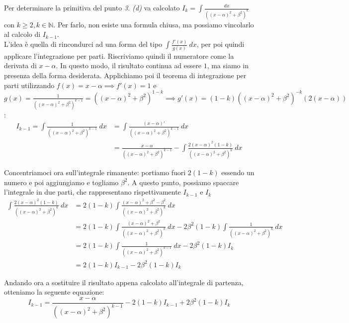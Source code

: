 \documentclass{article}
\begin{document}
\noindent Per determinare la primitiva del punto \textit{3. (d)} va calcolato $I_k = \int \frac{dx}{((x - \alpha)^2 + \beta^2)^k}$ con $k \geq 2, k \in \mathbb{N}$. Per farlo, non esiste una formula chiusa, ma possiamo vincolarlo al calcolo di $I_{k - 1}$. \\
L'idea è quella di rincondurci ad una forma del tipo $\int \frac{f'(x)}{g(x)} \ dx$, per poi quindi applicare l'integrazione per parti. Riscriviamo quindi il numeratore come la derivata di $x - \alpha$. In questo modo, il risultato continua ad essere $1$, ma siamo in presenza della forma desiderata. Applichiamo poi il teorema di integrazione per parti utilizzando $f(x) = x - \alpha \implies f'(x) = 1$ e $g(x) = \frac{1}{((x - \alpha)^2 + \beta^2)^{k - 1}} = ((x - \alpha)^2 + \beta^2)^{1 - k} \implies g'(x) = (1 - k)((x - \alpha)^2 + \beta^2)^{-k}(2(x - \alpha))$:
\begin{align*}
    I_{k - 1} = \int \frac{1}{((x - \alpha)^2 + \beta^2)^{k - 1}} \ dx &= \int \frac{(x - \alpha)'}{((x - \alpha)^2 + \beta^2)^{k - 1}} \ dx \\ 
    &= \frac{x - \alpha}{((x - \alpha)^2 + \beta^2)^{k - 1}} - \int \frac{2(x - \alpha)^2(1 - k)}{((x - \alpha)^2 + \beta^2)^k} \ dx
\end{align*}

\noindent Concentriamoci ora sull'integrale rimanente: portiamo fuori $2(1 - k)$ essendo un numero e poi aggiungiamo e togliamo $\beta^2$. A questo punto, possiamo spaccare l'integrale in due parti, che rappresentano rispettivamente $I_{k - 1}$ e $I_{k}$
\begin{align*}
    \int \frac{2(x - \alpha)^2(1 - k)}{((x - \alpha)^2 + \beta^2)^k} \ dx &= 2(1 - k) \int \frac{(x - \alpha)^2 + \beta^2 - \beta^2}{((x - \alpha)^2 + \beta^2)^k} \ dx \\
    &= 2(1 - k) \int \frac{(x - \alpha)^2 + \beta^2}{((x - \alpha)^2 + \beta^2)^k} \ dx - 2\beta^2(1 - k) \int \frac{1}{((x - \alpha)^2 + \beta^2)^k} \ dx \\
    &= 2(1 - k) \int \frac{1}{((x - \alpha)^2 + \beta^2)^{k - 1}} \ dx - 2\beta^2(1 - k) I_k \\
    &= 2(1 - k)I_{k - 1} - 2\beta^2(1 - k) I_k
\end{align*}

\noindent Andando ora a sostituire il risultato appena calcolato all'integrale di partenza, otteniamo la seguente equazione:
\begin{equation*}
    I_{k - 1} = \frac{x - \alpha}{((x - \alpha)^2 + \beta^2)^{k - 1}} - 2(1 - k)I_{k - 1} + 2\beta^2(1 - k) I_k
\end{equation*}
\end{document}
